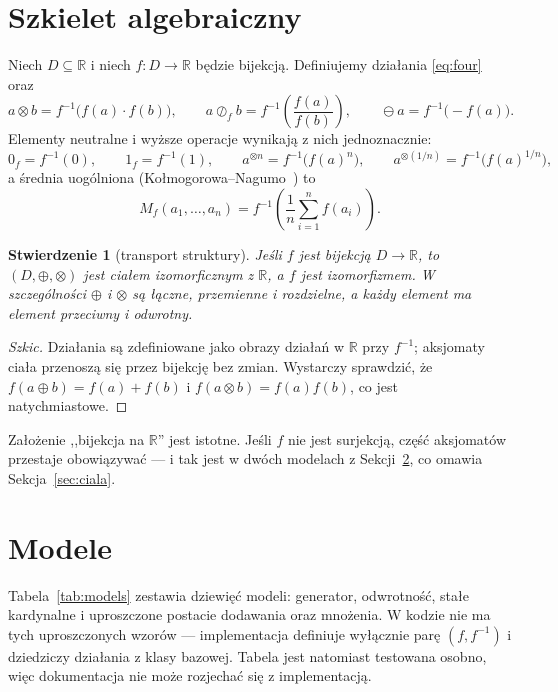 \documentclass[11pt,a4paper]{article}
\newtheorem{proposition}{Stwierdzenie}[section]
\newcommand{\ff}{f^{-1}}
\newcommand{\op}[1]{\mathbin{#1}}
\begin{document}
\section{Szkielet algebraiczny}

Niech $D\subseteq\mathbb{R}$ i niech $f\colon D\to\mathbb{R}$ będzie bijekcją.
Definiujemy działania \eqref{eq:four} oraz
\begin{equation}
a\op{\otimes}b=\ff\big(f(a)\cdot f(b)\big),\qquad
a\op{\oslash_f}b=\ff\!\left(\frac{f(a)}{f(b)}\right),\qquad
\ominus a=\ff\big(-f(a)\big).
\end{equation}
Elementy neutralne i wyższe operacje wynikają z nich jednoznacznie:
\begin{equation}
0_f=\ff(0),\qquad 1_f=\ff(1),\qquad
a^{\otimes n}=\ff\big(f(a)^n\big),\qquad
a^{\otimes(1/n)}=\ff\big(f(a)^{1/n}\big),
\end{equation}
a średnia uogólniona (Kołmogorowa--Nagumo~\cite{kolmogorov1930,nagumo1930}) to
\begin{equation}
M_f(a_1,\dots,a_n)=\ff\!\left(\frac{1}{n}\sum_{i=1}^{n}f(a_i)\right).
\end{equation}

\begin{proposition}[transport struktury]
Jeśli $f$ jest bijekcją $D\to\mathbb{R}$, to $(D,\oplus,\otimes)$ jest ciałem
izomorficznym z $\mathbb{R}$, a $f$ jest izomorfizmem. W szczególności
$\oplus$ i $\otimes$ są łączne, przemienne i rozdzielne, a każdy element ma
element przeciwny i odwrotny.
\end{proposition}

\begin{proof}[Szkic]
Działania są zdefiniowane jako obrazy działań w $\mathbb{R}$ przy $f^{-1}$;
aksjomaty ciała przenoszą się przez bijekcję bez zmian. Wystarczy sprawdzić, że
$f(a\oplus b)=f(a)+f(b)$ i $f(a\otimes b)=f(a)f(b)$, co jest natychmiastowe.
\end{proof}

Założenie ,,bijekcja na $\mathbb{R}$'' jest istotne. Jeśli $f$ nie jest
surjekcją, część aksjomatów przestaje obowiązywać — i tak jest w dwóch modelach
z Sekcji~\ref{sec:modele}, co omawia Sekcja~\ref{sec:ciala}.

\section{Modele}\label{sec:modele}

Tabela~\ref{tab:models} zestawia dziewięć modeli: generator, odwrotność, stałe
kardynalne i uproszczone postacie dodawania oraz mnożenia. W kodzie nie ma tych
uproszczonych wzorów — implementacja definiuje wyłącznie parę $(f,\ff)$ i
dziedziczy działania z klasy bazowej. Tabela jest natomiast testowana osobno,
więc dokumentacja nie może rozjechać się z implementacją.
\end{document}
